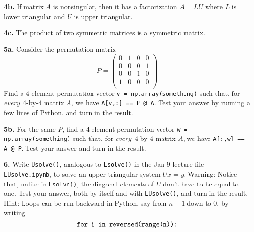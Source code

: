 \documentclass[11pt]{article}
\begin{document}
\par\medskip
{\bf 4b.}
If matrix $A$ is nonsingular, then it has a factorization $A=LU$
where $L$ is lower triangular and $U$ is upper triangular.

\par\medskip
{\bf 4c.}
The product of two symmetric matrices is a symmetric matrix.

\par\bigskip
{\bf 5a.} Consider the permutation matrix 
$$P =
   \left(
   \begin{array}{cccc}
    0 & 1 & 0 & 0 \\ 	
    0 & 0 & 0 & 1 \\ 	
    0 & 0 & 1 & 0 \\ 	
    1 & 0 & 0 & 0 \\ 	
   \end{array} \right)
$$
Find a 4-element permutation vector {\tt v = np.array(something)}
such that, for {\em every}\, 4-by-4 matrix $A$, 
we have {\tt A[v,:] == P @ A}.
Test your answer by running a few lines of Python, 
and turn in the result.

\par\medskip
{\bf 5b.} For the same $P$, 
find a 4-element permutation vector {\tt w = np.array(something)}
such that, for {\em every}\, 4-by-4 matrix $A$, 
we have {\tt A[:,w] == A @ P}. 
Test your answer and turn in the result.

\par\bigskip
{\bf 6.}
Write {\tt Usolve()}, analogous to {\tt Lsolve()} in 
the Jan 9 lecture file {\tt LUsolve.ipynb},
to solve an upper triangular system $Ux=y$. 
Warning: Notice that, unlike in {\tt Lsolve()}, 
the diagonal elements of $U$ don't have to be equal to one.
Test your answer, both by itself and with {\tt LUsolve()},
and turn in the result.
Hint: Loops can be run backward in Python, 
say from $n-1$ down to $0$, by writing
$$\mbox{\tt for i in reversed(range(n)):}$$
\end{document}
